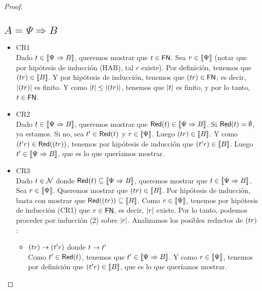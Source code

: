 \begin{proof}
  \subsection*{\( A = \Psi \Rightarrow B \)}
    \begin{itemize}
      \item CR1
        \\ Dado \( t \in \llbracket\Psi \Rightarrow B\rrbracket \), queremos mostrar que \( t \in \mathsf{FN} \).  Sea \( r \in \llbracket\Psi\rrbracket \) (notar que por hipótesis de inducción (HAB), tal \( r \) existe). Por definición, tenemos que \( (t r) \in \llbracket B\rrbracket \).
        Y por hipótesis de inducción, tenemos que \( (t r) \in \mathsf{FN} \), es decir, \( |(t r)| \) es finito.
        Y como \( |t| \leq |(t r)| \), tenemos que \( |t| \) es finito, y por lo tanto, \( t \in \mathsf{FN} \).
      \item CR2
        \\ Dado \( t \in \llbracket\Psi \Rightarrow B\rrbracket \), queremos mostrar que \( \mathsf{Red} (t) \in \llbracket\Psi \Rightarrow B\rrbracket \). Si \( \mathsf{Red} (t) = \emptyset \), ya estamos. Si no, sea \( t' \in \mathsf{Red} (t) \) y \( r \in \llbracket\Psi\rrbracket \).
        Luego \( (t r) \in \llbracket B\rrbracket \). Y como \( (t' r) \in \mathsf{Red} ((t r)) \), tenemos por hipótesis de inducción que \( (t' r) \in \llbracket B\rrbracket \).
        Luego \( t' \in \llbracket\Psi \Rightarrow B\rrbracket \), que es lo que queríamos mostrar.
      \item CR3
        \\ Dado \( t \in \mathcal{N} \) donde \( \mathsf{Red} (t) \subseteq \llbracket\Psi \Rightarrow B\rrbracket \), queremos mostrar que \( t \in \llbracket\Psi \Rightarrow B\rrbracket \). Sea \( r \in \llbracket\Psi\rrbracket \). Queremos mostrar que \( (t r) \in \llbracket B\rrbracket \). Por hipótesis de inducción, basta con mostrar que \( \mathsf{Red} ((t r)) \subseteq \llbracket B\rrbracket \).
        Como \( r \in \llbracket\Psi\rrbracket \), tenemos por hipótesis de inducción (CR1) que \( r \in \mathsf{FN} \), es decir, \( |r| \) existe. Por lo tanto, podemos proceder por inducción (2) sobre \( |r| \).
        Analizamos los posibles reductos de \( (t r) \):
        \begin{itemize}
          \item \( (t r) \rightarrow (t' r) \) donde \( t \rightarrow t' \)
            \\ Como \( t' \in \mathsf{Red} (t) \), tenemos que \( t' \in \llbracket\Psi \Rightarrow B\rrbracket \). Y como \( r \in \llbracket\Psi\rrbracket \), tenemos por definición que \( (t' r) \in \llbracket B\rrbracket \), que es lo que queríamos mostrar.

\end{itemize}
\end{itemize}
\end{proof}
